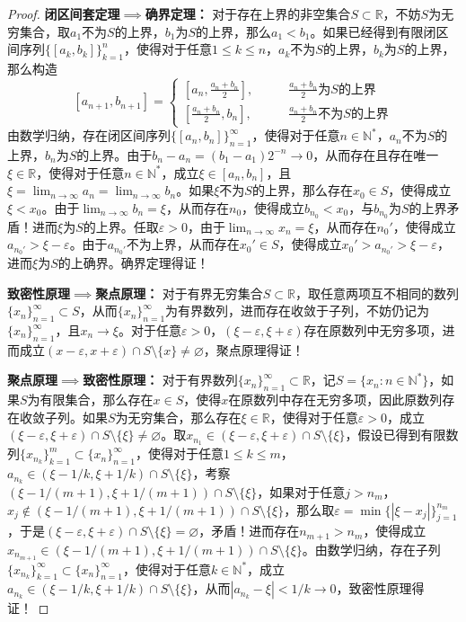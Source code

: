 \documentclass[lang = cn, scheme = chinese, thmcnt = section]{elegantbook}
\newcommand{\N}{\mathbb{N}}            %
\newcommand{\R}{\mathbb{R}}            %
\newcommand{\sub}{\subset}             %
\begin{document}
\begin{proof}
	{\bf 闭区间套定理$\implies$确界定理：}
	对于存在上界的非空集合$S\sub\R$，不妨$S$为无穷集合，取$a_1$不为$S$的上界，$b_1$为$S$的上界，那么$a_1<b_1$。如果已经得到有限闭区间序列$\{ [a_k,b_k] \}_{k=1}^{n}$，使得对于任意$1\le k\le n$，$a_k$不为$S$的上界，$b_k$为$S$的上界，那么构造
	$$
	[a_{n+1},b_{n+1}]=\begin{cases}
		\displaystyle\left[a_n,\frac{a_n+b_n}{2}\right],\qquad &\displaystyle \frac{a_n+b_n}{2}\text{为}S\text{的上界}\\
		\displaystyle\left[\frac{a_n+b_n}{2},b_n\right],\qquad &\displaystyle \frac{a_n+b_n}{2}\text{不为}S\text{的上界}
	\end{cases}
	$$
	由数学归纳，存在闭区间序列$\{ [a_n,b_n] \}_{n=1}^{\infty}$，使得对于任意$n\in\N^*$，$a_n$不为$S$的上界，$b_n$为$S$的上界。由于$b_n-a_n=(b_1-a_1)2^{-n}\to 0$，从而存在且存在唯一$\xi\in\R$，使得对于任意$n\in\N^*$，成立$\xi\in [a_n,b_n]$，且$\displaystyle \xi=\lim_{n\to\infty}a_n=\lim_{n\to\infty}b_n$。如果$\xi$不为$S$的上界，那么存在$x_0\in S$，使得成立$\xi< x_0$。由于$\displaystyle \lim_{n\to\infty}b_n=\xi$，从而存在$n_0$，使得成立$b_{n_0}<x_0$，与$b_{n_0}$为$S$的上界矛盾！进而$\xi$为$S$的上界。任取$\varepsilon>0$，由于$\displaystyle \lim_{n\to\infty}x_n=\xi$，从而存在$n_0'$，使得成立$a_{n_0'}>\xi-\varepsilon$。由于$a_{n_0'}$不为上界，从而存在$x_0'\in S$，使得成立$x_0'>a_{n_0'}>\xi-\varepsilon$，进而$\xi$为$S$的上确界。确界定理得证！
	
	{\bf 致密性原理$\implies$聚点原理：}
	对于有界无穷集合$S\sub\R$，取任意两项互不相同的数列$\{x_n\}_{n=1}^{\infty}\sub S$，从而$\{x_n\}_{n=1}^{\infty}$为有界数列，进而存在收敛于子列，不妨仍记为$\{x_n\}_{n=1}^{\infty}$，且$x_n\to\xi$。对于任意$\varepsilon>0$，$(\xi-\varepsilon,\xi+\varepsilon)$存在原数列中无穷多项，进而成立$(x-\varepsilon,x+\varepsilon)\cap S\setminus\{x\}\ne\varnothing$，聚点原理得证！
	
	{\bf 聚点原理$\implies$致密性原理：}
	对于有界数列$\{x_n\}_{n=1}^{\infty}\sub \R$，记$S=\{ x_n:n\in\N^* \}$，如果$S$为有限集合，那么存在$x\in S$，使得$x$在原数列中存在无穷多项，因此原数列存在收敛子列。如果$S$为无穷集合，那么存在$\xi\in \R$，使得对于任意$\varepsilon>0$，成立$(\xi-\varepsilon,\xi+\varepsilon)\cap S\setminus\{\xi\}\ne\varnothing$。取$x_{n_1}\in (\xi-\varepsilon,\xi+\varepsilon)\cap S\setminus\{\xi\}$，假设已得到有限数列$\{x_{n_k}\}_{k=1}^{m}\sub \{x_n\}_{n=1}^{\infty}$，使得对于任意$1\le k\le m$，$a_{n_k}\in (\xi-1/k,\xi+1/k)\cap S\setminus\{\xi\}$，考察$ (\xi-1/(m+1),\xi+1/(m+1))\cap S\setminus\{\xi\}$，如果对于任意$j>n_m$，$x_j\notin (\xi-1/(m+1),\xi+1/(m+1))\cap S\setminus\{\xi\}$，那么取$\varepsilon=\min\{ |\xi-x_j| \}_{j=1}^{n_m}$，于是$(\xi-\varepsilon,\xi+\varepsilon)\cap S\setminus\{\xi\}=\varnothing$，矛盾！进而存在$n_{m+1}>n_m$，使得成立$x_{n_{m+1}}\in (\xi-1/(m+1),\xi+1/(m+1))\cap S\setminus\{\xi\}$。由数学归纳，存在子列$\{x_{n_k}\}_{k=1}^{\infty}\sub \{x_n\}_{n=1}^{\infty}$，使得对于任意$k\in \N^*$，成立$a_{n_k}\in (\xi-1/k,\xi+1/k)\cap S\setminus\{\xi\}$，从而$|a_{n_k}-\xi|<1/k\to0$，致密性原理得证！
	

\end{proof}
\end{document}
